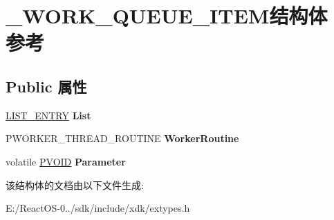 \hypertarget{struct___w_o_r_k___q_u_e_u_e___i_t_e_m}{}\section{\+\_\+\+W\+O\+R\+K\+\_\+\+Q\+U\+E\+U\+E\+\_\+\+I\+T\+E\+M结构体 参考}
\label{struct___w_o_r_k___q_u_e_u_e___i_t_e_m}
\subsection*{Public 属性}
\begin{DoxyCompactItemize}
\item 
\mbox{\label{struct___w_o_r_k___q_u_e_u_e___i_t_e_m_a6c7e95652fad1bc91597d2dc866952a0}} 
\hyperlink{struct___l_i_s_t___e_n_t_r_y}{L\+I\+S\+T\+\_\+\+E\+N\+T\+RY} {\bfseries List}
\item 
\mbox{\label{struct___w_o_r_k___q_u_e_u_e___i_t_e_m_a711c1b2dcd67a7c7b87ef5d1a68961df}} 
P\+W\+O\+R\+K\+E\+R\+\_\+\+T\+H\+R\+E\+A\+D\+\_\+\+R\+O\+U\+T\+I\+NE {\bfseries Worker\+Routine}
\item 
\mbox{\label{struct___w_o_r_k___q_u_e_u_e___i_t_e_m_a04d8d4cb85976b1388a0848678a773e4}} 
volatile \hyperlink{interfacevoid}{P\+V\+O\+ID} {\bfseries Parameter}
\end{DoxyCompactItemize}


该结构体的文档由以下文件生成\+:\begin{DoxyCompactItemize}
\item 
E\+:/\+React\+O\+S-\/0../sdk/include/xdk/extypes.\+h\end{DoxyCompactItemize}
